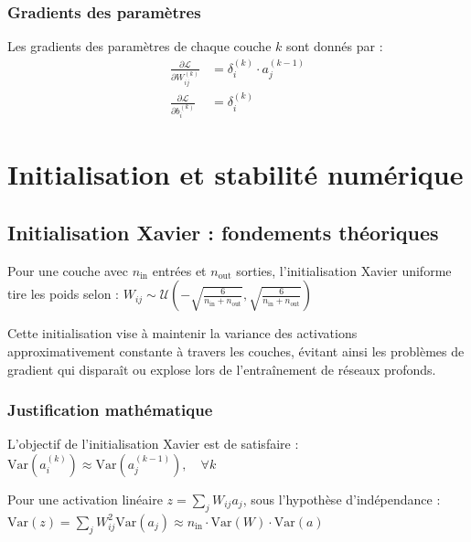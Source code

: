 \documentclass[12pt,a4paper]{report}
\numberwithin{equation}{section}
\begin{document}
\subsection{Gradients des paramètres}

\begin{theorem}
Les gradients des paramètres de chaque couche $k$ sont donnés par :
\begin{align}
\frac{\partial \mathcal{L}}{\partial W^{(k)}_{ij}} &= \delta^{(k)}_i \cdot a^{(k-1)}_j \label{eq:grad_weights}\\
\frac{\partial \mathcal{L}}{\partial b^{(k)}_i} &= \delta^{(k)}_i \label{eq:grad_bias}
\end{align}
\end{theorem}

\chapter{Initialisation et stabilité numérique}

\section{Initialisation Xavier : fondements théoriques}

\begin{theorem}
Pour une couche avec $n_{\text{in}}$ entrées et $n_{\text{out}}$ sorties, l'initialisation Xavier uniforme tire les poids selon :
$W_{ij} \sim \mathcal{U}\left(-\sqrt{\frac{6}{n_{\text{in}} + n_{\text{out}}}}, \sqrt{\frac{6}{n_{\text{in}} + n_{\text{out}}}}\right)$
\end{theorem}

\begin{remark}
Cette initialisation vise à maintenir la variance des activations approximativement constante à travers les couches, évitant ainsi les problèmes de gradient qui disparaît ou explose lors de l'entraînement de réseaux profonds.
\end{remark}

\subsection{Justification mathématique}

L'objectif de l'initialisation Xavier est de satisfaire :
$\text{Var}(a^{(k)}_i) \approx \text{Var}(a^{(k-1)}_j), \quad \forall k$

Pour une activation linéaire $z = \sum_{j} W_{ij} a_j$, sous l'hypothèse d'indépendance :
$\text{Var}(z) = \sum_{j} W_{ij}^2 \text{Var}(a_j) \approx n_{\text{in}} \cdot \text{Var}(W) \cdot \text{Var}(a)$
\end{document}
